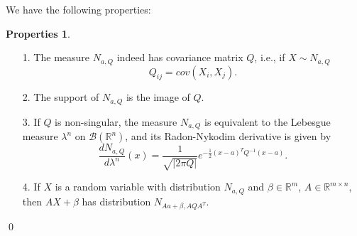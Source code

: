 \documentclass[10pt, a4paper]{report}
\newcommand{\R}[0]{\mathbb{R}}
\theoremstyle{definition}
\newtheorem*{properties*}{Properties}
\theoremstyle{remark}
\begin{document}
We have the following properties:
\begin{properties*}
	\begin{itemize}
		\item[]
		\item[1.] The measure $N_{a,Q}$ indeed has covariance matrix $Q$, i.e., if $X\sim N_{a,Q}$
		\[ Q_{ij} = cov\left(X_i,X_j\right). \]
		\item[2.] The support of $N_{a,Q}$ is the image of $Q$.
		\item[3.] If $Q$ is non-singular, the measure $N_{a,Q}$ is equivalent to the Lebesgue measure $\lambda^n$ on $\mathcal{B}(\R^n)$, and its Radon-Nykodim derivative is given by 
		\[\frac{dN_{a,Q}}{d\lambda^n}(x) = \frac{1}{\sqrt{\vert 2\pi Q \vert }}e^{-\frac{1}{2}(x-a)^T Q^{-1} (x-a)}. \]
		\item[4.] If $X$ is a random variable with distribution $N_{a,Q}$ and $\beta \in \R^m$, $A \in \R^{m\times n}$, then $A X + \beta$ has distribution $N_{A a + \beta, AQA^T}$. 
	\end{itemize}\qed
\end{properties*}
\end{document}
